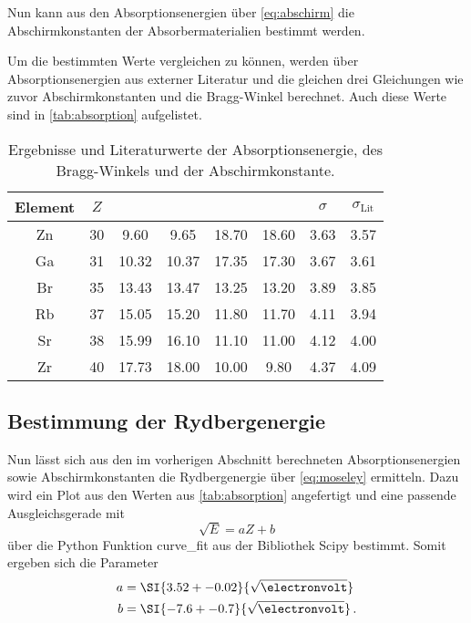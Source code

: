 Nun kann aus den Absorptionsenergien über \autoref{eq:abschirm} die Abschirmkonstanten der Absorbermaterialien bestimmt werden.

Um die bestimmten Werte vergleichen zu können, werden über Absorptionsenergien aus externer Literatur und die gleichen drei Gleichungen wie zuvor Abschirmkonstanten und die Bragg-Winkel berechnet.
Auch diese Werte sind in \autoref{tab:absorption} aufgelistet.

\begin{table}
    \centering
    \caption{Ergebnisse und Literaturwerte der Absorptionsenergie, des Bragg-Winkels und der Abschirmkonstante.\cite{absorption}}
    \begin{tabular}{c S[table-format=1.0] S S S S S S}
        \toprule
        Element & $Z$ &  &  & \tableSI{\theta}{\degree} &  & $\sigma$ & $\sigma_\text{Lit}$ \\
        \midrule
        Zn & 30 & 9.60 & 9.65 & 18.70 & 18.60 & 3.63 & 3.57 \\
        Ga & 31 & 10.32 & 10.37 & 17.35 & 17.30 & 3.67 & 3.61 \\
        Br & 35 & 13.43 & 13.47 & 13.25 & 13.20 & 3.89 & 3.85 \\
        Rb & 37 & 15.05 & 15.20 & 11.80 & 11.70 & 4.11 & 3.94 \\
        Sr & 38 & 15.99 & 16.10 & 11.10 & 11.00 & 4.12 & 4.00 \\
        Zr & 40 & 17.73 & 18.00 & 10.00 & 9.80 & 4.37 & 4.09 \\
        \bottomrule
    \end{tabular}
    \label{tab:absorption}
\end{table}



\subsection{Bestimmung der Rydbergenergie}
\label{ssec:rydberg}

Nun lässt sich aus den im vorherigen Abschnitt berechneten Absorptionsenergien sowie Abschirmkonstanten die Rydbergenergie über \autoref{eq:moseley} ermitteln.
Dazu wird ein Plot aus den Werten aus \autoref{tab:absorption} angefertigt und eine passende Ausgleichsgerade mit
\begin{equation*}
    \sqrt{E} = aZ+b
\end{equation*}
über die Python Funktion curve\_fit aus der Bibliothek Scipy bestimmt.
Somit ergeben sich die Parameter
\begin{align*}
    a &= \SI{3.52+-0.02}{\sqrt{\electronvolt}} \\
    b &= \SI{-7.6+-0.7}{\sqrt{\electronvolt}} \,.
\end{align*}


